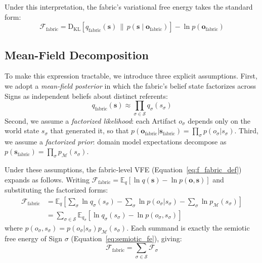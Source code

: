 \documentclass[11pt,a4paper]{article}
\theoremstyle{definition}
\newcommand{\E}{\mathbb{E}}
\newcommand{\KL}{\mathrm{D}_{\mathrm{KL}}}
\newcommand{\bq}{q}
\newcommand{\bp}{p}
\newcommand{\bo}{\bm{o}}
\newcommand{\bs}{\bm{s}}
\begin{document}
Under this interpretation, the fabric’s variational free energy takes the standard form:
\begin{equation}
\label{eq:f_fabric_def}
\mathcal{F}_{\text{fabric}} = \KL\!\left[\bq_{\text{fabric}}(\bs) \,\|\, \bp(\bs \mid \bo_{\text{fabric}})\right] - \ln \bp(\bo_{\text{fabric}})
\end{equation}

\subsection{Mean-Field Decomposition}
\label{cor:f_fabric}

To make this expression tractable, we introduce three explicit assumptions. First, we adopt a \emph{mean-field posterior} in which the fabric's belief state factorizes across Signs as independent beliefs about distinct referents:
\begin{equation}
\bq_{\text{fabric}}(\bs) \approx \prod_{\sigma \in \mathcal{S}} \bq_\sigma(s_\sigma)
\end{equation}
Second, we assume a \emph{factorized likelihood}: each Artifact $o_\sigma$ depends only on the world state $s_\sigma$ that generated it, so that $\bp(\bo_{\text{fabric}} | \bs_{\text{fabric}}) = \prod_\sigma \bp(o_\sigma | s_\sigma)$. Third, we assume a \emph{factorized prior}: domain model expectations decompose as $\bp(\bs_{\text{fabric}}) = \prod_\sigma \bp_{\mathcal{M}}(s_\sigma)$.

Under these assumptions, the fabric-level VFE (Equation~\ref{eq:f_fabric_def}) expands as follows. Writing $\mathcal{F}_{\text{fabric}} = \E_{\bq}[\ln \bq(\bs) - \ln \bp(\bo, \bs)]$ and substituting the factorized forms:
\begin{align}
\mathcal{F}_{\text{fabric}}
&= \E_{\bq}\!\left[\sum_\sigma \ln \bq_\sigma(s_\sigma) - \sum_\sigma \ln \bp(o_\sigma | s_\sigma) - \sum_\sigma \ln \bp_{\mathcal{M}}(s_\sigma)\right] \nonumber\\
&= \sum_{\sigma \in \mathcal{S}} \E_{\bq_\sigma}\!\left[\ln \bq_\sigma(s_\sigma) - \ln \bp(o_\sigma, s_\sigma)\right]
\label{eq:fmaterial}
\end{align}
where $\bp(o_\sigma, s_\sigma) = \bp(o_\sigma | s_\sigma)\bp_{\mathcal{M}}(s_\sigma)$. Each summand is exactly the semiotic free energy of Sign $\sigma$ (Equation~\ref{eq:semiotic_fe}), giving:
\begin{equation}
\label{eq:complexity}
\mathcal{F}_{\text{fabric}} = \sum_{\sigma \in \mathcal{S}} \mathcal{F}_\sigma
\end{equation}
\end{document}
